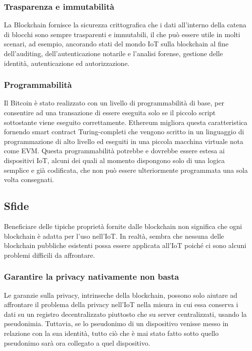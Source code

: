 \documentclass[a4paper,12pt,draft]{article}
\begin{document}
\subsubsection{Trasparenza e immutabilità}
La Blockchain fornisce la sicurezza crittografica che i dati all'interno della catena di blocchi sono sempre trasparenti e immutabili, il che può essere utile in molti scenari, ad esempio, ancorando stati del mondo IoT sulla blockchain al fine dell'auditing, dell'autenticazione notarile e l'analisi forense, gestione delle identità, autenticazione ed autorizzazione.

\subsubsection{Programmabilità}
Il Bitcoin è stato realizzato con un livello di programmabilità di base, per consentire ad una transazione di essere eseguita solo se il piccolo script sottostante viene eseguito correttamente. Ethereum migliora questa caratteristica
fornendo smart contract Turing-completi che vengono scritto in un linguaggio di programmazione di alto livello ed eseguiti in una piccola macchina virtuale nota come EVM. Questa programmabilità potrebbe e dovrebbe essere estesa ai dispositivi IoT, alcuni dei quali al momento dispongono solo di una logica semplice e già codificata, che non può essere ulteriormente programmata una sola volta consegnati.

\subsection{Sfide}
Beneficiare delle tipiche proprietà fornite dalle blockchain non significa che ogni blockchain è adatta per l'uso nell'IoT. In realtà, sembra che nessuna delle blockchain pubbliche esistenti possa essere applicata all'IoT poiché ci sono alcuni problemi difficili da affrontare.

\subsubsection{Garantire la privacy nativamente non basta}
Le garanzie sulla privacy, intrinseche della blockchain, possono solo aiutare ad affrontare il problema della privacy
nell'IoT nella misura in cui essa conserva i dati su un registro decentralizzato piuttosto che su server centralizzati, usando la pseudonimia. Tuttavia, se lo pseudonimo di un dispositivo venisse messo in relazione con la sua identità, tutto ciò che è mai stato fatto sotto quello pseudonimo sarà ora collegato a quel dispositivo.
\end{document}
